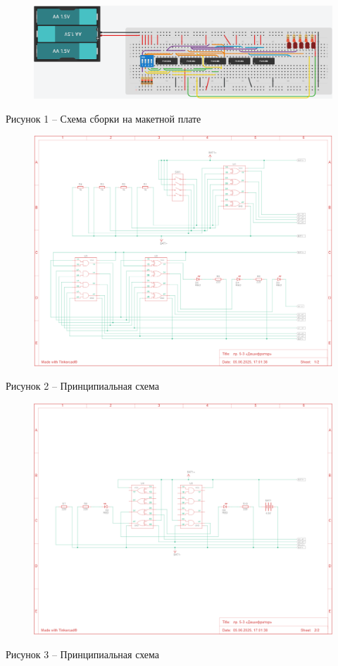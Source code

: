\documentclass[a4paper,14pt]{extarticle}
\begin{document}
  \begin{figure}[h]
    \centering
    \includegraphics[width=1\linewidth]{images/image-1}
  \end{figure}
  \begin{center}
    Рисунок 1 – Схема сборки на макетной плате
  \end{center}

  \pagebreak

  \begin{figure}[h]
    \centering
    \includegraphics[width=0.72\linewidth]{images/image-2}
  \end{figure}
  \begin{center}
    Рисунок 2 – Принципиальная схема
  \end{center}

  \begin{figure}[h]
    \centering
    \includegraphics[width=0.72\linewidth]{images/image-3}
  \end{figure}
  \begin{center}
    Рисунок 3 – Принципиальная схема
  \end{center}
\end{document}
